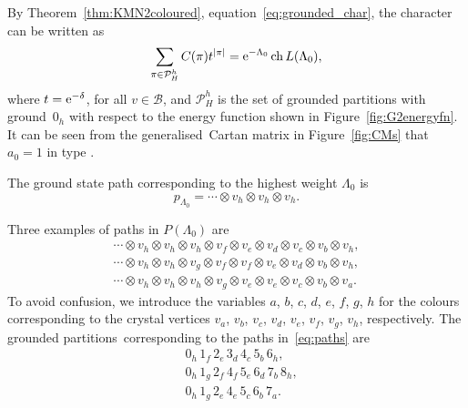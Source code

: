 \documentclass[10pt,a4paper]{amsart}
\numberwithin{equation}{section}
\theoremstyle{definition}
\begin{document}
By Theorem~\ref{thm:KMN2coloured}, equation~\eqref{eq:grounded_char},
the character can be written as
\begin{align*}
\sum_{\pi \in \mathcal{P}_H^{h}} C(\pi) t^{|\pi|} = {\rm e}^{-\Lambda_0} \operatorname{ch} L(\Lambda_0),
\end{align*}
where $t = {\rm e}^{-\delta}$,  for all $v \in \mathcal{B}$, and $\mathcal{P}_H^{h}$ is the set of grounded partitions with ground~$0_{h}$ with respect to the energy function shown in Figure~\ref{fig:G2energyfn}. It can be seen from the generalised~Cartan matrix in Figure~\ref{fig:CMs} that $a_0=1$ in type .

The ground state path corresponding to the highest weight $\Lambda_0$ is
\[
p_{\Lambda_0}=\cdots\otimes v_h\otimes v_h\otimes v_h.
\]

Three examples of paths in $P(\Lambda_0)$ are
\begin{equation}\label{eq:paths}
\begin{gathered}
\cdots\otimes v_h\otimes v_h\otimes v_h\otimes v_f\otimes v_e\otimes v_d\otimes v_c\otimes v_b\otimes v_h,\\
\cdots\otimes v_h\otimes v_h\otimes v_g\otimes v_f\otimes v_f\otimes v_e\otimes v_d\otimes v_b\otimes v_h,\\
\cdots\otimes v_h\otimes v_h\otimes v_h\otimes v_g\otimes v_e\otimes v_e\otimes v_c\otimes v_b\otimes v_a.
\end{gathered}
\end{equation}
To avoid confusion, we introduce the variables $a$, $b$, $c$, $d$, $e$, $f$, $g$, $h$ for the colours corresponding to the crystal vertices $v_a$, $v_b$, $v_c$, $v_d$, $v_e$, $v_f$, $v_g$, $v_h$, respectively. The grounded partitions~corresponding to the paths in~\eqref{eq:paths} are
\begin{align*}
&0_h\,1_f\,2_e\,3_d\,4_c\,5_b\,6_h,\\
&0_h\,1_g\,2_f\,4_f\,5_e\,6_d\,7_b\,8_h,\\
&0_h\,1_g\,2_e\,4_e\,5_c\,6_b\,7_a.
\end{align*}
\end{document}
